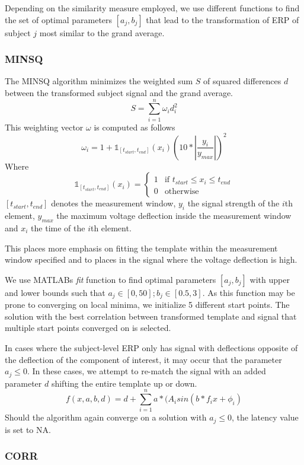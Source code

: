 \documentclass[
  man,floatsintext]{apa7}
\begin{document}
Depending on the similarity measure employed, we use different functions to find the set of optimal parameters \([a_j, b_j]\) that lead to the transformation of ERP of subject \(j\) most similar to the grand average.

\hypertarget{minsq}{%
\subsubsection{MINSQ}\label{minsq}}

The MINSQ algorithm minimizes the weighted sum \(S\) of squared differences \(d\) between the transformed subject signal and the grand average.
\[S = \sum_{i = 1}^{n}\omega_{i}d_{i}^2\]
This weighting vector \(\omega\) is computed as follows
\[\omega_i = 1+\mathbb{1}_{[t_{start}, t_{end}]}(x_i)(10 * |\frac{y_i}{y_{max}}|)^2\]
Where
\[\mathbb{1}_{[t_{start}, t_{end}]}(x_i) = \begin{cases} 1 & \text{if $t_{start} \le x_i \le t_{end}$} \\ 0 & \text{otherwise}\end{cases}\]\([t_{start}, t_{end}]\) denotes the measurement window, \(y_{i}\) the signal strength of the \(i\)th element, \(y_{max}\) the maximum voltage deflection inside the measurement window and \(x_i\) the time of the \(i\)th element.

This places more emphasis on fitting the template within the measurement window specified and to places in the signal where the voltage deflection is high.

We use MATLABs \emph{fit} function to find optimal parameters \([a_j, b_j]\) with upper and lower bounds such that \(a_j \in [0, 50]; b_j \in [0.5, 3]\). As this function may be prone to converging on local minima, we initialize 5 different start points. The solution with the best correlation between transformed template and signal that multiple start points converged on is selected.

In cases where the subject-level ERP only has signal with deflections opposite of the deflection of the component of interest, it may occur that the parameter \(a_j \le 0\). In these cases, we attempt to re-match the signal with an added parameter \(d\) shifting the entire template up or down.
\[f(x, a,b, d) = d +\sum_{i = 1}^{n} a*(A_isin(b*f_ix + \phi_i)\]
Should the algorithm again converge on a solution with \(a_j \le 0\), the latency value is set to NA.

\hypertarget{corr}{%
\subsubsection{CORR}\label{corr}}
\end{document}
